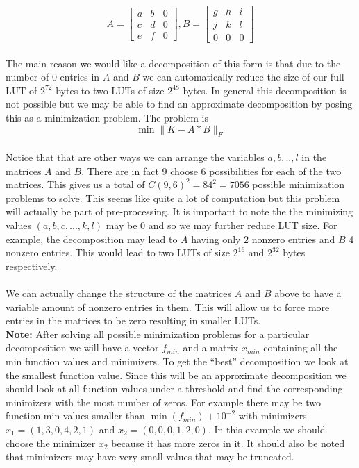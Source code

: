 \documentclass[12pt]{amsart}
\theoremstyle{definition}
\theoremstyle{remark}
\numberwithin{thm}{section}
\begin{document}
$$
A
=
\begin{bmatrix}
a & b & 0\\
c & d & 0\\
e & f & 0
\end{bmatrix}
,
B=
\begin{bmatrix}
g & h & i\\
j & k & l\\
0 & 0 & 0
\end{bmatrix}$$
\\
The main reason we would like a decomposition of this form is that due to the number of 0 entries in $A$ and $B$ we can automatically reduce the size of our full LUT of $2^{72}$ bytes to two LUTs of size $2^{48}$ bytes. In general this decomposition is not possible but we may be able to find an approximate decomposition by posing this as a minimization problem. The problem is 
$$\min \|K-A*B\|_F$$
\\
Notice that that are other ways we can arrange the variables $a,b,..,l$ in the matrices $A$ and $B$. There are in fact 9 choose 6 possibilities for each of the two matrices. This gives us a total of  $C(9,6)^2 =84^2= 7056$ possible minimization problems to solve. This seems like quite a lot of computation but this problem will actually be part of pre-processing. It is important to note the the minimizing values $(a,b,c,...,k,l)$ may be 0 and so we may further reduce LUT size. For example, the decomposition may lead to $A$ having only 2 nonzero entries and $B$ 4 nonzero entries. This would lead to two LUTs of size $2^{16}$ and $2^{32}$ bytes respectively.
\\
\\We can actually change the structure of the matrices $A$ and $B$ above to have a variable amount of nonzero entries in them. This will allow us to force more entries in the matrices to be zero resulting in smaller LUTs. 
\\
\textbf{Note:} After solving all possible minimization problems for a particular decomposition we will have a vector \textit{$f_{min}$} and a matrix \textit{$x_{min}$} containing all the min function values and minimizers. To get the ``best'' decomposition we look at the smallest function value. Since this will be an approximate decomposition we should look at all function values under a threshold and find the corresponding minimizers with the most number of zeros. For example there may be two function min values smaller than $\min(f_{min}) + 10^{-2}$ with minimizers $x_1=(1, 3, 0, 4, 2, 1)$ and $x_2=(0, 0, 0, 1, 2, 0)$. In this example we should choose the minimizer $x_2$ because it has more zeros in it. It should also be noted that minimizers may have very small values that may be truncated. 
\end{document}
